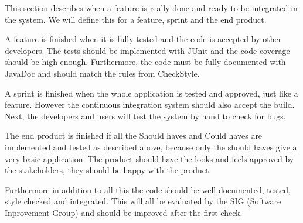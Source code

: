 This section describes when a feature is really done and ready to be integrated in the system. We will define this for a feature, sprint and the end product.

A feature is finished when it is fully tested and the code is accepted by other developers.
The tests should be implemented with JUnit and the code coverage should be high enough.
Furthermore, the code must be fully documented with JavaDoc and should match the rules from CheckStyle.

A sprint is finished when the whole application is tested and approved, just like a feature. However the continuous integration system should also accept the build. Next, the developers and users will test the system by hand to check for bugs.

The end product is finished if all the Should haves and Could haves are implemented and tested as described above, because only the should haves give a very basic application. The product should have the looks and feels approved by the stakeholders, they should be happy with the product.

Furthermore in addition to all this the code should be well documented, tested, style checked and integrated. This will all be evaluated by the SIG (Software Inprovement Group) and should be improved after the first check.